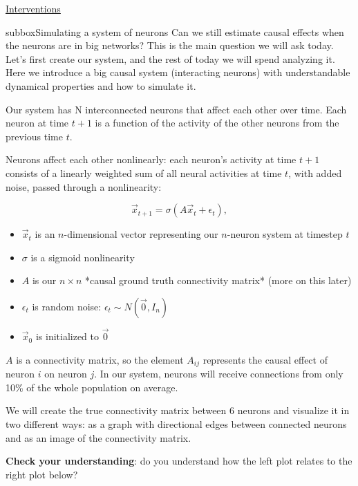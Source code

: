 \begin{textbox}{\href{https://compneuro.neuromatch.io/tutorials/W3D5_NetworkCausality/student/W3D5_Tutorial1.html}{Interventions }   }
\begin{subbox}{subbox}{Simulating a system of neurons}
\scriptsize
Can we still estimate causal effects when the neurons are in big networks? This is the main question we will ask today. Let's first create our system, and the rest of today we will spend analyzing it.
Here we introduce a big causal system (interacting neurons) with understandable dynamical properties and how to simulate it.

Our system has N interconnected neurons that affect each other over time. Each neuron at time $t+1$ is a function of the activity of the other neurons from the previous time $t$. 

Neurons affect each other nonlinearly: each neuron's activity at time $t+1$ consists of a linearly weighted sum of all neural activities at time $t$, with added noise, passed through a nonlinearity:

\begin{equation*}
\vec{x}_{t+1} = \sigma(A\vec{x}_t + \epsilon_t),
\end{equation*}
\begin{itemize}
    \item 
 $\vec{x}_t$ is an $n$-dimensional vector representing our $n$-neuron system at timestep $t$
  \item $\sigma$ is a sigmoid nonlinearity
  \item $A$ is our $n \times n$ *causal ground truth connectivity matrix* (more on this later)
  \item $\epsilon_t$ is random noise: $\epsilon_t \sim N(\vec{0}, I_n)$
  \item $\vec{x}_0$ is initialized to $\vec{0}$
\end{itemize}

$A$ is a connectivity matrix, so the element $A_{ij}$ represents the causal effect of neuron $i$ on neuron $j$. In our system, neurons will receive connections from only 10\% of the whole population on average.

We will create the true connectivity matrix between 6 neurons and visualize it in two different ways: as a graph with directional edges between connected neurons and as an image of the connectivity matrix.

\textbf{Check your understanding}: do you understand how the left plot relates to the right plot below?
\begin{center}
    

\end{center}
\end{subbox}
\end{textbox}
